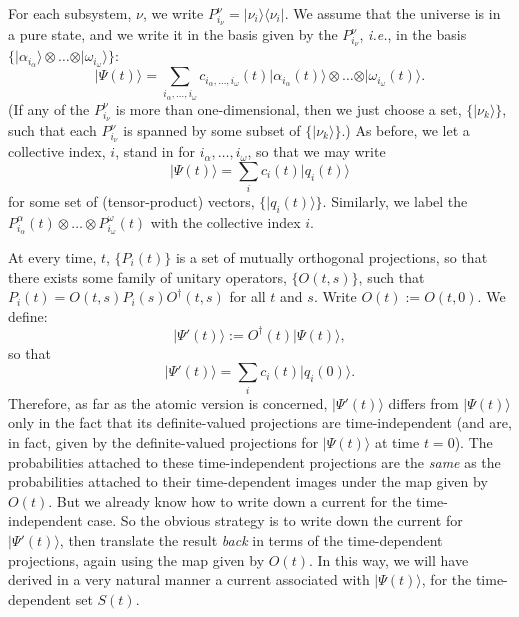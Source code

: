 \documentclass[12pt]{article}
\newcommand{\be}{\begin{equation}}
\newcommand{\ee}{\end{equation}}
\newcommand{\ie}{{\it i.e.}}         %
\newcommand{\ga}{\alpha}                                        %
\newcommand{\gn}{\nu}                                           %
\newcommand{\gw}{\omega}                                        %
\newcommand{\bra}[1]{\langle #1\vert}                           %
\newcommand{\ket}[1]{\vert #1\rangle}                           %
\begin{document}
For each subsystem, $\gn$, we write $P^\gn_{i_\gn} = 
\ket{\gn_i}\bra{\gn_i}$.  We assume that the universe is in a pure 
state, and we write it in the basis given by the $P^\gn_{i_\gn}$, \ie, 
in the basis $\{\ket{\ga_{i_\ga}} \otimes
\ldots \otimes \ket{\gw_{i_\gw}}\}$:
\be
  \label{eq:universe}
  \ket{\Psi(t)} = \sum_{i_\ga, \ldots , i_\gw} c_{i_\ga, \ldots , 
  i_\gw}(t) \ket{\ga_{i_\ga}(t)} \otimes \ldots \otimes 
  \ket{\gw_{i_\gw}(t)}.
\ee
(If any of the $P^\gn_{i_\gn}$ is more than one-dimensional, then we 
just choose a set, $\{\ket{\gn_k}\}$, such that each $P^\gn_{i_\gn}$ 
is spanned by some subset of $\{\ket{\gn_k}\}$.) As before, we let a 
collective index, $i$, stand in for $i_\ga, \ldots , i_\gw$, so that 
we may write
\be
  \label{eq:simpleuniverse}
  \ket{\Psi(t)} = \sum_i c_i(t) \ket{q_i(t)}
\ee
for some set of (tensor-product) vectors, $\{\ket{q_i(t)}\}$.  
Similarly, we label the $P^\ga_{i_\ga}(t) \otimes \ldots \otimes 
P^\gw_{i_\gw}(t)$ with the collective index $i$.

At every time, $t$, $\{P_i(t)\}$ is a set of mutually orthogonal 
projections, so that there exists some family of unitary operators, 
$\{O(t,s)\}$, such that $P_i(t) = O(t,s) P_i(s) O^{\dagger}(t,s)$ for 
all $t$ and $s$.  Write $O(t):=O(t,0)$.  We define:
\be
  \label{eq:Psiprime}
  \ket{\Psi'(t)} := O^{\dagger}(t)\ket{\Psi(t)},
\ee
so that
\be
  \label{eq:Psiprime2}
  \ket{\Psi'(t)} = \sum_i c_i(t) \ket{q_{i}(0)}.
\ee
Therefore, as far as the atomic version is concerned, $\ket{\Psi'(t)}$ 
differs from $\ket{\Psi(t)}$ only in the fact that its definite-valued 
projections are time-independent (and are, in fact, given by the 
definite-valued projections for $\ket{\Psi(t)}$ at time $t = 0$).  The 
probabilities attached to these time-independent projections are the 
{\it same} as the probabilities attached to their time-dependent 
images under the map given by $O(t)$.  But we already know how to 
write down a current for the time-independent case.  So the obvious 
strategy is to write down the current for $\ket{\Psi'(t)}$, then 
translate the result {\it back} in terms of the time-dependent 
projections, again using the map given by $O(t)$.  In this way, we 
will have derived in a very natural manner a current associated with 
$\ket{\Psi(t)}$, for the time-dependent set $S(t)$.
\end{document}
